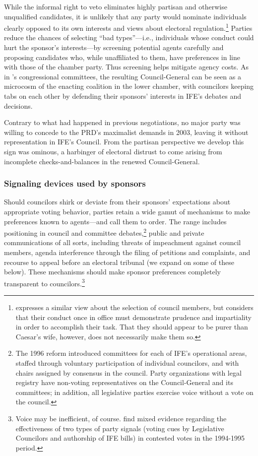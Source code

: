 \documentclass[12 pt, letter]{article}
\begin{document}
While the informal right to veto eliminates highly partisan and otherwise unqualified candidates, it is unlikely that any party would nominate individuals clearly opposed to its own interests and views about electoral regulation.\footnote{\citet{Schedler2000a}expresses a similar view about the selection of council members, but considers that their conduct once in office must demonstrate prudence and impartiality in order to accomplish their task.  That they should appear to be purer than Caesar's wife, however, does not necessarily make them so.}  Parties reduce the chances of selecting ``bad types''---i.e., individuals whose conduct could hurt the sponsor's interests---by screening potential agents carefully and proposing candidates who, while unaffiliated to them, have preferences in line with those of the chamber party.  Thus screening helps mitigate agency costs.  As in \citeauthor*{Cox1993}'s\citeyearpar{Cox1993} congressional committees, the resulting Council-General can be seen as a microcosm of the enacting coalition in the lower chamber, with councilors keeping tabs on each other by defending their sponsors' interests in IFE's debates and decisions.

Contrary to what had happened in previous negotiations, no major party was willing to concede to the PRD's maximalist demands in 2003, leaving it without representation in IFE's Council.  From the partisan perspective we develop this sign was ominous, a harbinger of electoral distrust to come arising from incomplete checks-and-balances in the renewed Council-General.

\subsubsection{Signaling devices used by sponsors}
Should councilors shirk or deviate from their sponsors' expectations
about appropriate voting behavior, parties retain a wide gamut of
mechanisms to make preferences known to agents---and call them to
order.  The range includes positioning in council and committee
debates,\footnote{The 1996 reform introduced committees for each of
IFE's operational areas, staffed through voluntary participation of
individual councilors, and with chairs assigned by consensus in the
council. Party organizations with legal registry have non-voting
representatives on the Council-General and its committees; in
addition, all legislative parties exercise voice without a vote on
the council.} public and private communications of all sorts,
including threats of impeachment against council members, agenda
interference through the filing of petitions and complaints, and
recourse to appeal before an electoral tribunal (we expand on some
of these below).  These mechanisms should make sponsor preferences
completely transparent to councilors.\footnote{Voice may be
inefficient, of course.  \citet{Malo1996} find mixed evidence
regarding the effectiveness of two types of party signals (voting
cues by Legislative Councilors and authorship of IFE bills) in
contested votes in the 1994-1995 period.}
\end{document}
